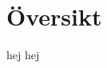 \documentclass[designspec/spec.tex]{subfiles}
\begin{document}
\section{Översikt}

hej hej
\end{document}
